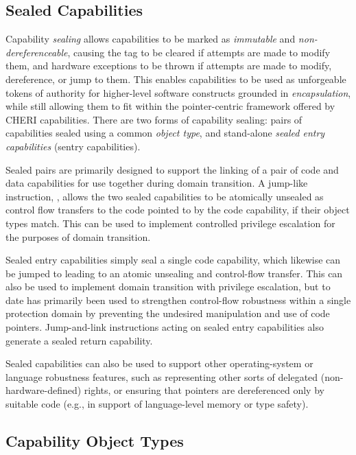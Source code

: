 \subsection{Sealed Capabilities}
\label{sec:model-sealedcapabilities}

Capability \textit{sealing} allows capabilities to be marked as
\textit{immutable} and \textit{non-deref\-erenceable}, causing the tag to be
cleared if attempts are made to modify them, and hardware exceptions to be
thrown if attempts are made to modify, dereference, or jump to them.
This enables capabilities to be used as unforgeable tokens of authority for
higher-level software constructs grounded in \textit{encapsulation}, while
still allowing them to fit within the pointer-centric framework offered by CHERI
capabilities.
There are two forms of capability sealing: pairs of capabilities sealed
using a common \textit{object type}, and stand-alone \textit{sealed entry
capabilities} (sentry capabilities).

Sealed pairs are primarily designed to support the linking of a pair of code
and data capabilities for use together during domain transition.
A jump-like instruction, , allows the two sealed
capabilities to be atomically unsealed as control flow transfers to the code
pointed to by the code capability, if their object types match.
This can be used to implement controlled privilege escalation for the purposes
of domain transition.

Sealed entry capabilities simply seal a single code capability, which likewise
can be jumped to leading to an atomic unsealing and control-flow transfer.
This can also be used to implement domain transition with privilege
escalation, but to date has primarily been used to strengthen control-flow
robustness within a single protection domain by preventing the undesired
manipulation and use of code pointers.
Jump-and-link instructions acting on sealed entry capabilities also generate
a sealed return capability.

Sealed capabilities can also be used to support other operating-system or
language robustness features, such as representing other sorts of delegated
(non-hardware-defined) rights, or ensuring that pointers are dereferenced only
by suitable code (e.g., in support of language-level memory or type safety).


\subsection{Capability Object Types}
\label{sec:model-object-types}

